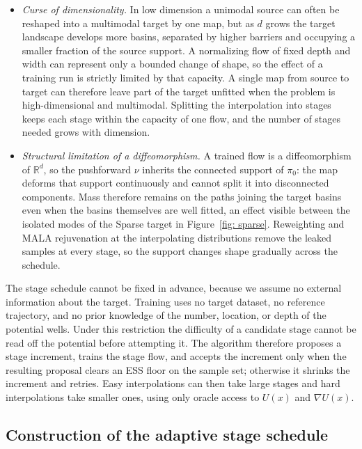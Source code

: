 \documentclass{article}
\begin{document}
\begin{itemize}
    \item \emph{Curse of dimensionality.} In low dimension a unimodal source can often be reshaped into a multimodal target by one map, but as $d$ grows the target landscape develops more basins, separated by higher barriers and occupying a smaller fraction of the source support. A normalizing flow of fixed depth and width can represent only a bounded change of shape, so the effect of a training run is strictly limited by that capacity. A single map from source to target can therefore leave part of the target unfitted when the problem is high-dimensional and multimodal. Splitting the interpolation into stages keeps each stage within the capacity of one flow, and the number of stages needed grows with dimension.

    \item \emph{Structural limitation of a diffeomorphism.} A trained flow is a diffeomorphism of $\mathbb R^d$, so the pushforward $\nu$ inherits the connected support of $\pi_0$: the map deforms that support continuously and cannot split it into disconnected components. Mass therefore remains on the paths joining the target basins even when the basins themselves are well fitted, an effect visible between the isolated modes of the Sparse target in Figure~\ref{fig: sparse}. Reweighting and MALA rejuvenation at the interpolating distributions remove the leaked samples at every stage, so the support changes shape gradually across the schedule.
\end{itemize}

The stage schedule cannot be fixed in advance, because we assume no external information about the target. Training uses no target dataset, no reference trajectory, and no prior knowledge of the number, location, or depth of the potential wells. Under this restriction the difficulty of a candidate stage cannot be read off the potential before attempting it. The algorithm therefore proposes a stage increment, trains the stage flow, and accepts the increment only when the resulting proposal clears an ESS floor on the sample set; otherwise it shrinks the increment and retries. Easy interpolations can then take large stages and hard interpolations take smaller ones, using only oracle access to $U(x)$ and $\nabla U(x)$.

\subsection{Construction of the adaptive stage schedule}
\end{document}
